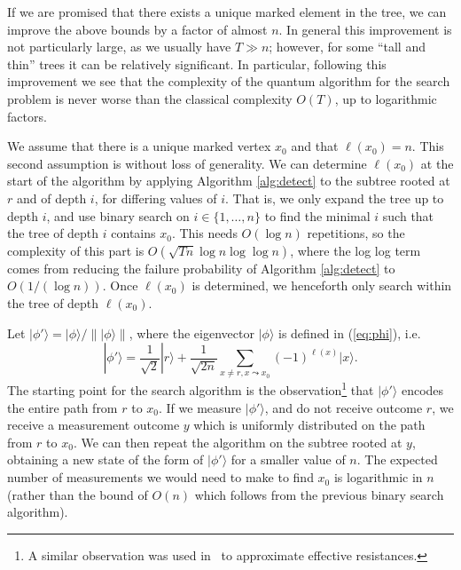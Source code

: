 \documentclass[11pt]{article}
\newcommand{\ket}[1]{| #1 \rangle}
\begin{document}
If we are promised that there exists a unique marked element in the tree, we can improve the above bounds by a factor of almost $n$. In general this improvement is not particularly large, as we usually have $T \gg n$; however, for some ``tall and thin'' trees it can be relatively significant. In particular, following this improvement we see that the complexity of the quantum algorithm for the search problem is never worse than the classical complexity $O(T)$, up to logarithmic factors.

We assume that there is a unique marked vertex $x_0$ and that $\ell(x_0) = n$. This second assumption is without loss of generality. We can determine $\ell(x_0)$ at the start of the algorithm by applying Algorithm \ref{alg:detect} to the subtree rooted at $r$ and of depth $i$, for differing values of $i$. That is, we only expand the tree up to depth $i$, and use binary search on $i \in \{1,\dots,n\}$ to find the minimal $i$ such that the tree of depth $i$ contains $x_0$. This needs $O(\log n)$ repetitions, so the complexity of this part is $O(\sqrt{Tn} \log n \log \log n)$, where the log log term comes from reducing the failure probability of Algorithm \ref{alg:detect} to $O(1/(\log n))$. Once $\ell(x_0)$ is determined, we henceforth only search within the tree of depth $\ell(x_0)$.

Let $\ket{\phi'} = \ket{\phi}/\|\ket{\phi}\|$, where the eigenvector $\ket{\phi}$ is defined in (\ref{eq:phi}), i.e.
%
\[ \ket{\phi'} = \frac{1}{\sqrt{2}} \ket{r} + \frac{1}{\sqrt{2n}} \sum_{x \neq r, x \leadsto x_0} (-1)^{\ell(x)} \ket{x}. \]
%
The starting point for the search algorithm is the observation\footnote{A similar observation was used in~\cite{wang13} to approximate effective resistances.} that $\ket{\phi'}$ encodes the entire path from $r$ to $x_0$. If we measure $\ket{\phi'}$, and do not receive outcome $r$, we receive a measurement outcome $y$ which is uniformly distributed on the path from $r$ to $x_0$. We can then repeat the algorithm on the subtree rooted at $y$, obtaining a new state of the form of $\ket{\phi'}$ for a smaller value of $n$. The expected number of measurements we would need to make to find $x_0$ is logarithmic in $n$ (rather than the bound of $O(n)$ which follows from the previous binary search algorithm).
\end{document}
